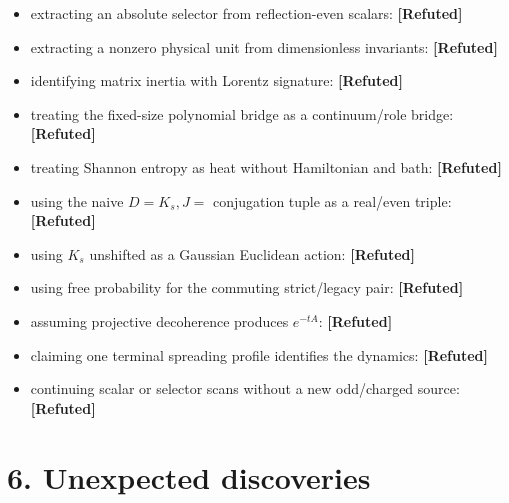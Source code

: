 \documentclass[11pt,a4paper,openany]{report}
\newcommand{\statusRefuted}{\textcolor{finred}{[Refuted]}}
\begin{document}
\begin{itemize}
\item 
extracting an absolute selector from reflection-even scalars: \textbf{\statusRefuted{}}

\item 
extracting a nonzero physical unit from dimensionless invariants: \textbf{\statusRefuted{}}

\item 
identifying matrix inertia with Lorentz signature: \textbf{\statusRefuted{}}

\item 
treating the fixed-size polynomial bridge as a continuum/\allowbreak{}role bridge: \textbf{\statusRefuted{}}

\item 
treating Shannon entropy as heat without Hamiltonian and bath: \textbf{\statusRefuted{}}

\item 
using the naive \(D=K_s,J=\) conjugation tuple as a real/\allowbreak{}even triple: \textbf{\statusRefuted{}}

\item 
using \(K_s\) unshifted as a Gaussian Euclidean action: \textbf{\statusRefuted{}}

\item 
using free probability for the commuting strict/\allowbreak{}legacy pair: \textbf{\statusRefuted{}}

\item 
assuming projective decoherence produces \(e^{-tA}\): \textbf{\statusRefuted{}}

\item 
claiming one terminal spreading profile identifies the dynamics: \textbf{\statusRefuted{}}

\item 
continuing scalar or selector scans without a new odd/\allowbreak{}charged source: \textbf{\statusRefuted{}}

\end{itemize}

\section{6. Unexpected discoveries}
\end{document}
